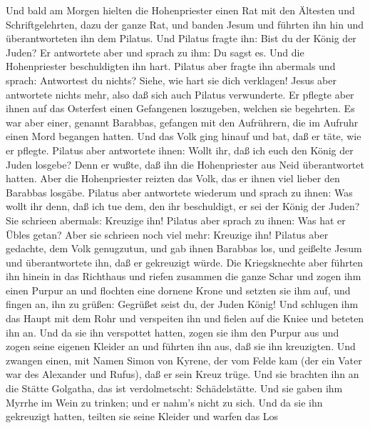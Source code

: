  Und bald am Morgen hielten die Hohenpriester einen Rat mit
den Ältesten und Schriftgelehrten, dazu der ganze Rat, und banden Jesum
und führten ihn hin und überantworteten ihn dem Pilatus. 
Und Pilatus fragte ihn: Bist du der König der Juden? Er antwortete aber
und sprach zu ihm: Du sagst es.  Und die Hohenpriester
beschuldigten ihn hart.  Pilatus aber fragte ihn abermals
und sprach: Antwortest du nichts? Siehe, wie hart sie dich verklagen!
 Jesus aber antwortete nichts mehr, also daß sich auch
Pilatus verwunderte.  Er pflegte aber ihnen auf das
Osterfest einen Gefangenen loszugeben, welchen sie begehrten.
 Es war aber einer, genannt Barabbas, gefangen mit den
Aufrührern, die im Aufruhr einen Mord begangen hatten.  Und
das Volk ging hinauf und bat, daß er täte, wie er pflegte. 
Pilatus aber antwortete ihnen: Wollt ihr, daß ich euch den König der
Juden losgebe?  Denn er wußte, daß ihn die Hohenpriester
aus Neid überantwortet hatten.  Aber die Hohenpriester
reizten das Volk, das er ihnen viel lieber den Barabbas losgäbe.
 Pilatus aber antwortete wiederum und sprach zu ihnen: Was
wollt ihr denn, daß ich tue dem, den ihr beschuldigt, er sei der König
der Juden?  Sie schrieen abermals: Kreuzige ihn!
 Pilatus aber sprach zu ihnen: Was hat er Übles getan? Aber
sie schrieen noch viel mehr: Kreuzige ihn!  Pilatus aber
gedachte, dem Volk genugzutun, und gab ihnen Barabbas los, und geißelte
Jesum und überantwortete ihn, daß er gekreuzigt würde.  Die
Kriegsknechte aber führten ihn hinein in das Richthaus und riefen
zusammen die ganze Schar  und zogen ihm einen Purpur an und
flochten eine dornene Krone und setzten sie ihm auf,  und
fingen an, ihn zu grüßen: Gegrüßet seist du, der Juden König!
 Und schlugen ihm das Haupt mit dem Rohr und verspeiten ihn
und fielen auf die Kniee und beteten ihn an.  Und da sie
ihn verspottet hatten, zogen sie ihm den Purpur aus und zogen seine
eigenen Kleider an und führten ihn aus, daß sie ihn kreuzigten.
 Und zwangen einen, mit Namen Simon von Kyrene, der vom
Felde kam (der ein Vater war des Alexander und Rufus), daß er sein Kreuz
trüge.  Und sie brachten ihn an die Stätte Golgatha, das
ist verdolmetscht: Schädelstätte.  Und sie gaben ihm Myrrhe
im Wein zu trinken; und er nahm's nicht zu sich.  Und da
sie ihn gekreuzigt hatten, teilten sie seine Kleider und warfen das Los

